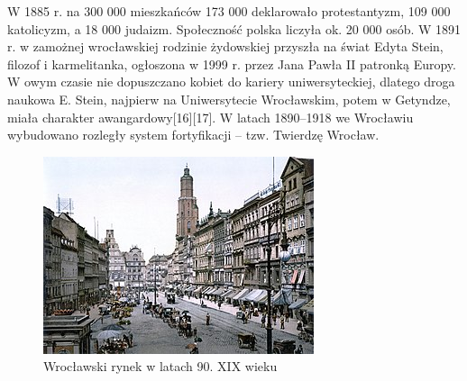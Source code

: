 \documentclass{article}
\begin{document}
\bigskip
\newline
W 1885 r. na 300 000 mieszkańców 173 000 deklarowało protestantyzm, 109 000 katolicyzm, a 18 000 judaizm. Społeczność polska liczyła ok. 20 000 osób.
\bigskip
\newline
W 1891 r. w zamożnej wrocławskiej rodzinie żydowskiej przyszła na świat Edyta Stein, filozof i karmelitanka, ogłoszona w 1999 r. przez Jana Pawła II patronką Europy. W owym czasie nie dopuszczano kobiet do kariery uniwersyteckiej, dlatego droga naukowa E. Stein, najpierw na Uniwersytecie Wrocławskim, potem w Getyndze, miała charakter awangardowy[16][17].
\bigskip
\newline
W latach 1890–1918 we Wrocławiu wybudowano rozległy system fortyfikacji – tzw. Twierdzę Wrocław.
\begin{figure}[h]
\centering
\includegraphics[scale=0.8]{11.jpg}
\caption{Wrocławski rynek w latach 90. XIX wieku}
\end{figure}
\end{document}
